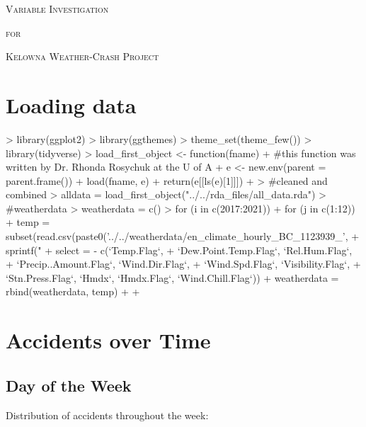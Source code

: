 \documentclass[11pt, a4paper]{article}
\begin{document}


\begin{center}
\Large{\textsc{Variable Investigation}}
\par
\normalsize{\textsc{for}}
\par
\large{\textsc{Kelowna Weather-Crash Project}}
\end{center}


\vspace{0.917 pc} %

\tableofcontents


\pagebreak
\section{Loading data}

\begin{Schunk}
\begin{Sinput}
> library(ggplot2)
> library(ggthemes)
> theme_set(theme_few())
> library(tidyverse)
> load_first_object <- function(fname){
+   #this function was written by Dr. Rhonda Rosychuk at the U of A
+   e <- new.env(parent = parent.frame())
+   load(fname, e)
+   return(e[[ls(e)[1]]])
+ }
> #cleaned and combined
> alldata = load_first_object("../../rda_files/all_data.rda")
> #weatherdata
> weatherdata = c()
> for (i in c(2017:2021)){
+   for (j in c(1:12)){
+     temp = subset(read.csv(paste0('../../weatherdata/en_climate_hourly_BC_1123939_', 
+       sprintf("%
+       select = - c(`Temp.Flag`, 
+       `Dew.Point.Temp.Flag`, `Rel.Hum.Flag`,
+       `Precip..Amount.Flag`, `Wind.Dir.Flag`, 
+       `Wind.Spd.Flag`, `Visibility.Flag`, 
+       `Stn.Press.Flag`, `Hmdx`, `Hmdx.Flag`, `Wind.Chill.Flag`))
+     weatherdata = rbind(weatherdata, temp)
+   }
+ }
\end{Sinput}
\end{Schunk}



\section{Accidents over Time}

\subsection{Day of the Week} 

Distribution of accidents throughout the week:
\end{document}
